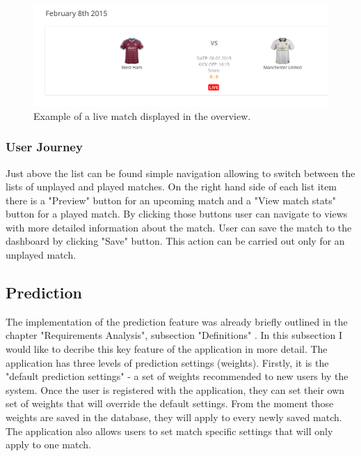 \begin{figure}[H]
	\begin{center}
		\includegraphics[width=.90\linewidth,natwidth=610,natheight=642]{impl/images/liveMatch}
		\caption{Example of a live match displayed in the overview.} \label{fig:using:livematch}
	\end{center}
\end{figure}

\subsubsection{User Journey}
\label{subsec:matchesoviewuserjourney}
Just above the list can be found simple navigation allowing to switch between the lists of unplayed and played matches. On the right hand side of each list item there is a "Preview" button for an upcoming match and a "View match stats" button for a played match. By clicking those buttons user can navigate to views with more detailed information about the match. User can save the match to the dashboard by clicking "Save" button. This action can be carried out only for an unplayed match.  

\subsection{Prediction}
\label{subsec:predictionimplementation}
The implementation of the prediction feature was already briefly outlined in the chapter "Requirements Analysis", subsection "Definitions" \cite{subsec:definitions}. In this subsection I would like to decribe this key feature of the application in more detail. The application has three levels of prediction settings (weights). Firstly, it is the "default prediction settings" - a set of weights recommended to new users by the system. Once the user is registered with the application, they can set their own set of weights that will override the default settings. From the moment those weights are saved in the database, they will apply to every newly saved match. The application also allows users to set match specific settings that will only apply to one match. 
 


